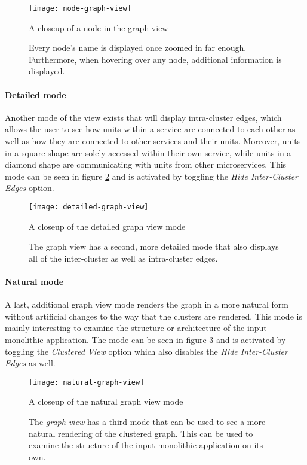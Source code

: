\documentclass[12pt,a4paper]{report}
\begin{document}
\begin{figure}[htbp]
\centering
\texttt{[image: node-graph-view]}
\caption{A closeup of a node in the graph view}
\caption*{\centering
  Every node's name is displayed once zoomed in far enough.
  Furthermore, when hovering over any node, additional information is displayed.
}
\label{fig:node-graph-view}
\end{figure}

\paragraph{Detailed mode}
Another mode of the view exists that
will display intra-cluster edges, which allows the user to see how units within
a service are connected to each other as well as how they are connected to
other services and their units. Moreover, units in a square shape are solely
accessed within their own service, while units in a diamond shape are
communicating with units from other microservices. This mode can be seen in
figure \ref{fig:detailed-graph-view} and is activated by toggling the \textit{
Hide Inter-Cluster Edges} option.

\begin{figure}[htbp]
\centering
\texttt{[image: detailed-graph-view]}
\caption{A closeup of the detailed graph view mode}
\caption*{\centering
  The graph view has a second, more detailed mode that also displays
  all of the inter-cluster as well as intra-cluster edges.
}
\label{fig:detailed-graph-view}
\end{figure}

\paragraph{Natural mode}
A last, additional graph view mode renders the graph
in a more natural form without artificial changes to the way that the clusters
are rendered. This mode is mainly interesting to examine the structure or
architecture of the input monolithic application. The mode can be seen in
figure \ref{fig:natural-graph-view} and is activated by toggling the \textit{
Clustered View} option which also disables the \textit{Hide Inter-Cluster
Edges} as well.

\begin{figure}[htbp]
\centering
\texttt{[image: natural-graph-view]}
\caption{A closeup of the natural graph view mode}
\caption*{\centering
  The \textit{graph view} has a third mode that can be used to see a more
  natural rendering of the clustered graph. This can be used to examine
  the structure of the input monolithic application on its own.
}
\label{fig:natural-graph-view}
\end{figure}
\end{document}
